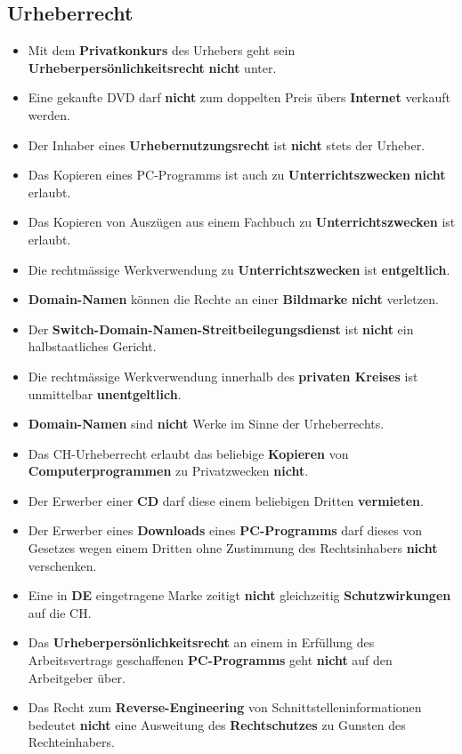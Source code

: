 \subsection{Urheberrecht}
\begin{itemize}
	\item Mit dem \textbf{Privatkonkurs} des Urhebers geht sein \textbf{Urheberpersönlichkeitsrecht} \textbf{nicht} unter.
	\item Eine gekaufte DVD darf \textbf{nicht} zum doppelten Preis übers \textbf{Internet} verkauft werden.
	\item Der Inhaber eines \textbf{Urhebernutzungsrecht} ist \textbf{nicht} stets der Urheber.
	\item Das Kopieren eines PC-Programms ist auch zu \textbf{Unterrichtszwecken} \textbf{nicht} erlaubt.
	\item Das Kopieren von Auszügen aus einem Fachbuch zu \textbf{Unterrichtszwecken} ist erlaubt.
	\item Die rechtmässige Werkverwendung zu \textbf{Unterrichtszwecken} ist \textbf{entgeltlich}.
	\item \textbf{Domain-Namen} können die Rechte an einer \textbf{Bildmarke} \textbf{nicht} verletzen.
	\item Der \textbf{Switch-Domain-Namen-Streitbeilegungsdienst} ist \textbf{nicht} ein halbstaatliches Gericht.
	\item Die rechtmässige Werkverwendung innerhalb des \textbf{privaten Kreises} ist unmittelbar \textbf{unentgeltlich}.
	\item \textbf{Domain-Namen} sind \textbf{nicht} Werke im Sinne der Urheberrechts.
	\item Das CH-Urheberrecht erlaubt das beliebige \textbf{Kopieren} von \textbf{Computerprogrammen} zu Privatzwecken \textbf{nicht}.
	\item Der Erwerber einer \textbf{CD} darf diese einem beliebigen Dritten \textbf{vermieten}.
	\item Der Erwerber eines \textbf{Downloads} eines \textbf{PC-Programms} darf dieses von Gesetzes wegen einem Dritten ohne Zustimmung des Rechtsinhabers \textbf{nicht} verschenken.
	\item Eine in \textbf{DE} eingetragene Marke zeitigt \textbf{nicht} gleichzeitig \textbf{Schutzwirkungen} auf die CH.
	\item Das \textbf{Urheberpersönlichkeitsrecht} an einem in Erfüllung des Arbeitsvertrags geschaffenen \textbf{PC-Programms} geht \textbf{nicht} auf den Arbeitgeber über.
	\item Das Recht zum \textbf{Reverse-Engineering} von Schnittstelleninformationen bedeutet \textbf{nicht} eine Ausweitung des \textbf{Rechtschutzes} zu Gunsten des Rechteinhabers.

\end{itemize}
